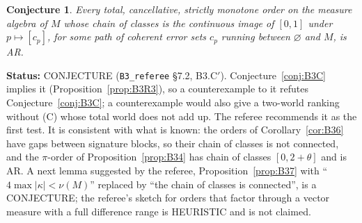 \documentclass[11pt]{article}
\newtheorem{conjecture}[theorem]{Conjecture}
\theoremstyle{definition}
\theoremstyle{remark}
\newcommand{\src}[1]{\texttt{#1}}
\newcommand{\status}[1]{\par\smallskip\noindent\textbf{Status:} #1\par\smallskip}
\begin{document}
\begin{conjecture}\label{conj:B3Cp}
Every total, cancellative, strictly monotone order on the measure algebra of $M$ whose chain of classes is the continuous image of $[0,1]$ under $p\mapsto[c_p]$, for some path of coherent error sets $c_p$ running between $\varnothing$ and $M$, is AR.
\end{conjecture}
\status{CONJECTURE (\src{B3\_referee} \S7.2, B3.C$'$). Conjecture~\ref{conj:B3C} implies it (Proposition~\ref{prop:B3R3}), so a counterexample to it refutes Conjecture~\ref{conj:B3C}; a counterexample would also give a two-world ranking without (C) whose total world does not add up. The referee recommends it as the first test. It is consistent with what is known: the orders of Corollary~\ref{cor:B36} have gaps between signature blocks, so their chain of classes is not connected, and the $\pi$-order of Proposition~\ref{prop:B34} has chain of classes $[0,2+\theta]$ and is AR. A next lemma suggested by the referee, Proposition~\ref{prop:B37} with ``$4\max|\kappa|<\nu(M)$'' replaced by ``the chain of classes is connected'', is a CONJECTURE; the referee's sketch for orders that factor through a vector measure with a full difference range is HEURISTIC and is not claimed.}
\end{document}
